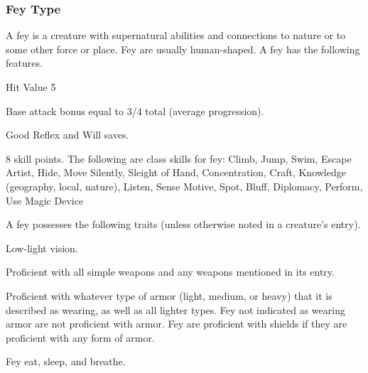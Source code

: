 {\subsubsection{Fey Type} A fey is a creature with supernatural abilities and connections to nature or to some other force or place. Fey are usually human-shaped.
 A fey has the following features.
\begin{itemize*}
\item Hit Value 5
\item Base attack bonus equal to 3/4 total  (average progression).
\item Good Reflex and Will saves.
\item 8 skill points. The following are class skills for fey: Climb, Jump, Swim, Escape Artist, Hide, Move Silently, Sleight of Hand, Concentration, Craft, Knowledge (geography, local, nature), Listen, Sense Motive, Spot, Bluff, Diplomacy, Perform, Use Magic Device
\end{itemize*}
 A fey possesses the following traits (unless otherwise noted in a creature's entry).
\begin{itemize*}
\item Low-light vision.
\item Proficient with all simple weapons and any weapons mentioned in its entry.
\item Proficient with whatever type of armor (light, medium, or heavy) that it is described as wearing, as well as all lighter types. Fey not indicated as wearing armor are not proficient with armor. Fey are proficient with shields if they are proficient with any form of armor.
\item Fey eat, sleep, and breathe.
\end{itemize*}

}

